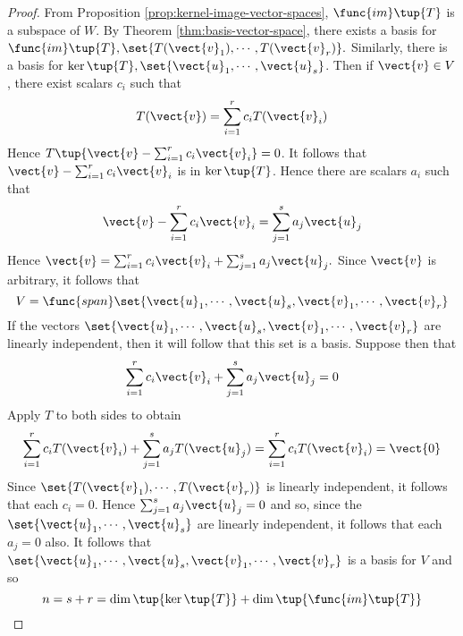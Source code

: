 \begin{proof}
From Proposition \ref{prop:kernel-image-vector-spaces}, $\func{im}\tup{T} $
is a subspace of $W$. By Theorem \ref{thm:basis-vector-space}, there exists a basis for $
\func{im}\tup{T} ,\set{T(\vect{v}_{1}),\cdots ,T(\vect{v}_{r})}
. $ Similarly, there is a basis for $\ker \tup{T} ,\set{\vect{u}
_{1},\cdots ,\vect{u}_{s}}$. Then if $\vect{v}\in V$, there exist
scalars $c_{i}$ such that 
\begin{equation*}
T(\vect{v})=\sum_{i=1}^{r}c_{i}T(\vect{v}_{i})
\end{equation*}
Hence $T\tup{\vect{v}-\sum_{i=1}^{r}c_{i}\vect{v}_{i}} =0$. It follows
that $\vect{v}-\sum_{i=1}^{r}c_{i}\vect{v}_{i}$ is in $\ker \tup{T}$.
Hence there are scalars $a_{i}$ such that 
\begin{equation*}
\vect{v}-\sum_{i=1}^{r}c_{i}\vect{v}_{i}=\sum_{j=1}^{s}a_{j}\vect{u}_{j}
\end{equation*}
Hence $\vect{v}=\sum_{i=1}^{r}c_{i}\vect{v}_{i}+\sum_{j=1}^{s}a_{j}\vect{u}
_{j}. $ Since $\vect{v}$ is arbitrary, it follows that 
\begin{equation*}
V=\func{span}\set{\vect{u}_{1},\cdots ,\vect{u}_{s},\vect{v}_{1},\cdots ,
\vect{v}_{r}}
\end{equation*}
If the vectors $\set{\vect{u}_{1},\cdots ,\vect{u}_{s},\vect{v}_{1},\cdots ,
\vect{v}_{r}} $ are linearly independent, then it will follow that
this set is a basis. Suppose then that 
\begin{equation*}
\sum_{i=1}^{r}c_{i}\vect{v}_{i}+\sum_{j=1}^{s}a_{j}\vect{u}_{j}=0
\end{equation*}
Apply $T$ to both sides to obtain 
\begin{equation*}
\sum_{i=1}^{r}c_{i}T(\vect{v}_{i})+\sum_{j=1}^{s}a_{j}T(\vect{u}
_{j})=\sum_{i=1}^{r}c_{i}T(\vect{v}_{i})= \vect{0}
\end{equation*}
Since $\set{T(\vect{v}_{1}),\cdots ,T(\vect{v}_{r})} $ is linearly
independent, it follows that each $c_{i}=0$. Hence $\sum_{j=1}^{s}a_{j}\vect{u
}_{j}=0$ and so, since the $\set{\vect{u}_{1},\cdots ,\vect{u}_{s}} $
are linearly independent, it follows that each $a_{j}=0$ also. It follows
that $\set{\vect{u}_{1},\cdots ,\vect{u}_{s},\vect{v}_{1},\cdots ,\vect{v}
_{r}} $ is a basis for $V$ and so 
\begin{equation*}
n=s+r=\dim \tup{\ker \tup{T} } +\dim \tup{\func{im}\tup{
T} }
\end{equation*}
\end{proof}


